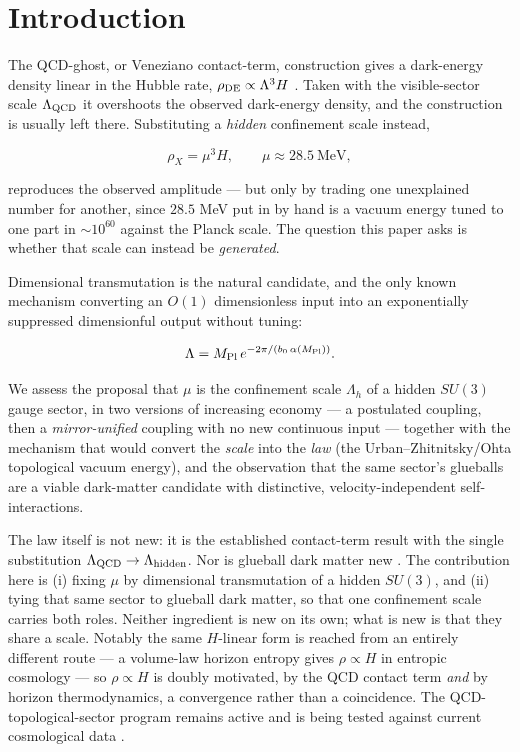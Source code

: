 \documentclass[preprint,12pt]{elsarticle}
\begin{document}
\section{Introduction}\label{sec-1}

The QCD-ghost, or Veneziano contact-term, construction gives a
dark-energy density linear in the Hubble rate,
\(\rho_{\rm DE} \propto \Lambda^3 H\)
\citep{Urban:2009vy, Urban:2009yg, Ohta:2010in, Cai:2010uf}. Taken with
the visible-sector scale \(\Lambda_{\rm QCD}\) it overshoots the
observed dark-energy density, and the construction is usually left
there. Substituting a \emph{hidden} confinement scale instead,

\begin{equation}\rho_X = \mu^3 H, \qquad \mu \approx 28.5\ \text{MeV},\end{equation}

reproduces the observed amplitude --- but only by trading one
unexplained number for another, since \(28.5\) MeV put in by hand is a
vacuum energy tuned to one part in \(\sim 10^{60}\) against the Planck
scale. The question this paper asks is whether that scale can instead be
\emph{generated}.

Dimensional transmutation \citep{Coleman:1973jx} is the natural
candidate, and the only known mechanism converting an \(O(1)\)
dimensionless input into an exponentially suppressed dimensionful output
without tuning:

\begin{equation}\Lambda = M_{\rm Pl}\, e^{-2\pi / (b_0\, \alpha(M_{\rm Pl}))}.\end{equation}

We assess the proposal that \(\mu\) is the confinement scale
\(\Lambda_h\) of a hidden \(SU(3)\) gauge sector, in two versions of
increasing economy --- a postulated coupling, then a
\emph{mirror-unified} coupling with no new continuous input --- together
with the mechanism that would convert the \emph{scale} into the
\emph{law} (the Urban--Zhitnitsky/Ohta topological vacuum energy), and
the observation that the same sector's glueballs are a viable
dark-matter candidate with distinctive, velocity-independent
self-interactions.

The law itself is not new: it is the established contact-term result
with the single substitution
\(\Lambda_{\rm QCD} \to \Lambda_{\rm hidden}\). Nor is glueball dark
matter new
\citep{Boddy:2014yra, Soni:2016gzf, Halverson:2016nfq, Forestell:2017wov}.
The contribution here is (i) fixing \(\mu\) by dimensional transmutation
of a hidden \(SU(3)\), and (ii) tying that same sector to glueball dark
matter, so that one confinement scale carries both roles. Neither
ingredient is new on its own; what is new is that they share a scale.
Notably the same \(H\)-linear form is reached from an entirely different
route --- a volume-law horizon entropy gives \(\rho \propto H\) in
entropic cosmology \citep{Komatsu:2015nkb, Komatsu:2012zh} --- so
\(\rho \propto H\) is doubly motivated, by the QCD contact term
\emph{and} by horizon thermodynamics, a convergence rather than a
coincidence. The QCD-topological-sector program remains active and is
being tested against current cosmological data
\citep{VanWaerbeke:2025shm}.
\end{document}
